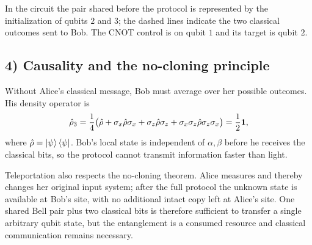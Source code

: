 \begin{center}
\end{center}
In the circuit the pair shared before the protocol is represented by the initialization of qubits $2$ and $3$; the dashed lines indicate the two classical outcomes sent to Bob. The CNOT control is on qubit $1$ and its target is qubit $2$.

\subsection*{4) Causality and the no-cloning principle}

Without Alice's classical message, Bob must average over her possible outcomes. His density operator is
\begin{equation}
\hat{\rho}_3=\frac14\bigl(\hat{\rho}+\sigma_x\hat{\rho}\sigma_x
+\sigma_z\hat{\rho}\sigma_z+\sigma_x\sigma_z\hat{\rho}\sigma_z\sigma_x\bigr)
=\frac12\mathbf1,
\end{equation}
where $\hat{\rho}=\left|\psi\right\rangle\left\langle\psi\right|$. Bob's local state is independent of $\alpha,\beta$ before he receives the classical bits, so the protocol cannot transmit information faster than light.

Teleportation also respects the no-cloning theorem. Alice measures and thereby changes her original input system; after the full protocol the unknown state is available at Bob's site, with no additional intact copy left at Alice's site. One shared Bell pair plus two classical bits is therefore sufficient to transfer a single arbitrary qubit state, but the entanglement is a consumed resource and classical communication remains necessary.